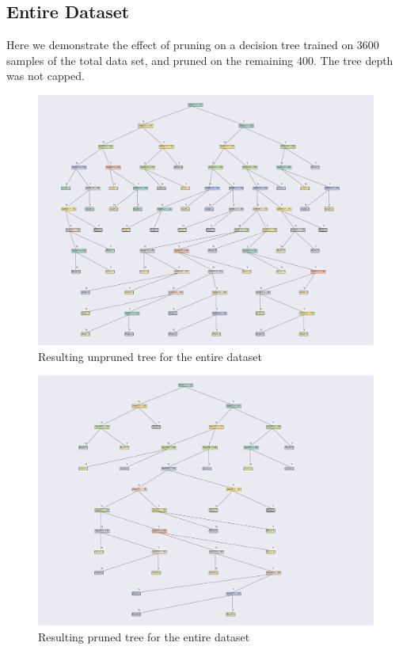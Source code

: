 \subsection{Entire Dataset}
Here we demonstrate the effect of pruning on a decision tree trained on 3600 samples of the total data set, and pruned on the remaining 400. The tree depth was not capped. 
\begin{figure}[H]
    \centering
    \includegraphics[width=\textwidth]{figures/total_unpruned.pdf}
    \caption[Unpruned Tree for the Entire Dataset]{Resulting unpruned tree for the entire dataset}
    \label{fig:pruning_example_total_unpruned}
\end{figure}

\newpage
\begin{figure}[H]
    \centering
    \includegraphics[width=\textwidth]{figures/total_pruned.pdf}
    \caption[Pruned Tree for the Entire Dataset]{Resulting pruned tree for the entire dataset}
      \label{fig:pruning_example_total_pruned}
\end{figure}